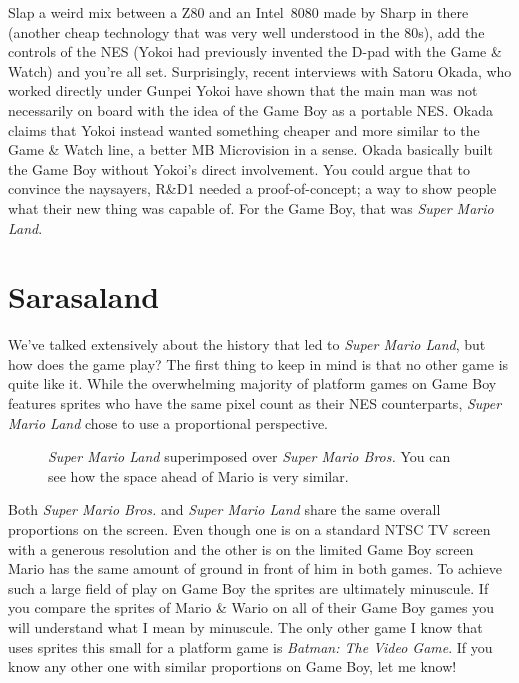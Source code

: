 \documentclass{book}
\begin{document}
Slap a weird mix between a Z80 and an Intel~8080 made by Sharp in there (another cheap technology that was very well understood in the 80s), add the controls of the NES (Yokoi had previously invented the D-pad with the Game \& Watch) and you’re all set. Surprisingly, recent interviews with Satoru Okada, who worked directly under Gunpei Yokoi have shown that the main man was not necessarily on board with the idea of the Game Boy as a portable NES. Okada claims that Yokoi instead wanted something cheaper and more similar to the Game \& Watch line, a better MB Microvision in a sense. Okada basically built the Game Boy without Yokoi’s direct involvement. You could argue that to convince the naysayers, R\&D1 needed a proof-of-concept; a way to show people what their new thing was capable of. For the Game Boy, that was \emph{Super Mario Land}.\par
\FloatBarrier\section*{Sarasaland}
We’ve talked extensively about the history that led to \emph{Super Mario Land}, but how does the game play? The first thing to keep in mind is that no other game is quite like it. While the overwhelming majority of platform games on Game Boy features sprites who have the same pixel count as their NES counterparts, \emph{Super Mario Land} chose to use a proportional perspective.\par
\FloatBarrier\vspace{\baselineskip}\begin{figure}[H]\caption*{\emph{Super Mario Land} superimposed over \emph{Super Mario Bros.} You can see how the space ahead of Mario is very similar.}\end{figure}
Both \emph{Super Mario Bros.} and \emph{Super Mario Land} share the same overall proportions on the screen. Even though one is on a standard NTSC TV screen with a generous resolution and the other is on the limited Game Boy screen Mario has the same amount of ground in front of him in both games. To achieve such a large field of play on Game Boy the sprites are ultimately minuscule. If you compare the sprites of Mario \& Wario on all of their Game Boy games you will understand what I mean by minuscule. The only other game I know that uses sprites this small for a platform game is \emph{Batman: The Video Game}. If you know any other one with similar proportions on Game Boy, let me know!\par
\end{document}

